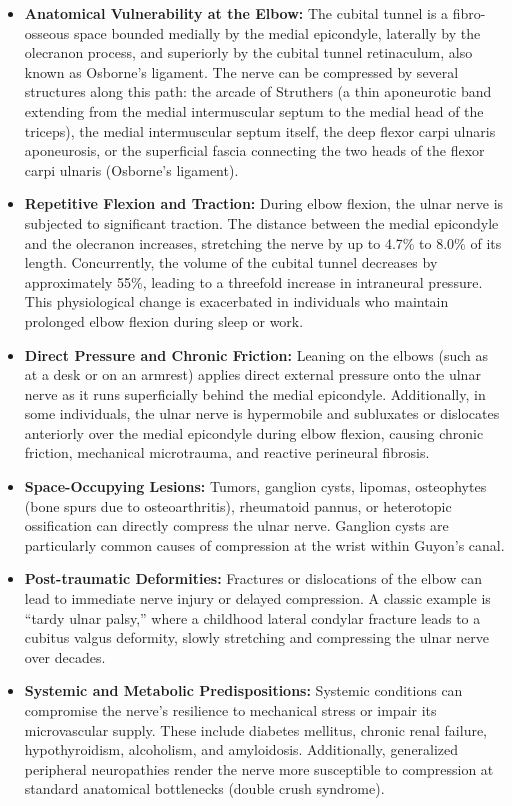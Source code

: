\begin{itemize}
\item \textbf{Anatomical Vulnerability at the Elbow:} The cubital tunnel is a fibro-osseous space bounded medially by the medial epicondyle, laterally by the olecranon process, and superiorly by the cubital tunnel retinaculum, also known as Osborne's ligament. The nerve can be compressed by several structures along this path: the arcade of Struthers (a thin aponeurotic band extending from the medial intermuscular septum to the medial head of the triceps), the medial intermuscular septum itself, the deep flexor carpi ulnaris aponeurosis, or the superficial fascia connecting the two heads of the flexor carpi ulnaris (Osborne's ligament).
\item \textbf{Repetitive Flexion and Traction:} During elbow flexion, the ulnar nerve is subjected to significant traction. The distance between the medial epicondyle and the olecranon increases, stretching the nerve by up to 4.7\% to 8.0\% of its length. Concurrently, the volume of the cubital tunnel decreases by approximately 55\%, leading to a threefold increase in intraneural pressure. This physiological change is exacerbated in individuals who maintain prolonged elbow flexion during sleep or work.
\item \textbf{Direct Pressure and Chronic Friction:} Leaning on the elbows (such as at a desk or on an armrest) applies direct external pressure onto the ulnar nerve as it runs superficially behind the medial epicondyle. Additionally, in some individuals, the ulnar nerve is hypermobile and subluxates or dislocates anteriorly over the medial epicondyle during elbow flexion, causing chronic friction, mechanical microtrauma, and reactive perineural fibrosis.
\item \textbf{Space-Occupying Lesions:} Tumors, ganglion cysts, lipomas, osteophytes (bone spurs due to osteoarthritis), rheumatoid pannus, or heterotopic ossification can directly compress the ulnar nerve. Ganglion cysts are particularly common causes of compression at the wrist within Guyon's canal.
\item \textbf{Post-traumatic Deformities:} Fractures or dislocations of the elbow can lead to immediate nerve injury or delayed compression. A classic example is ``tardy ulnar palsy,'' where a childhood lateral condylar fracture leads to a cubitus valgus deformity, slowly stretching and compressing the ulnar nerve over decades.
\item \textbf{Systemic and Metabolic Predispositions:} Systemic conditions can compromise the nerve's resilience to mechanical stress or impair its microvascular supply. These include diabetes mellitus, chronic renal failure, hypothyroidism, alcoholism, and amyloidosis. Additionally, generalized peripheral neuropathies render the nerve more susceptible to compression at standard anatomical bottlenecks (double crush syndrome).
\end{itemize}

